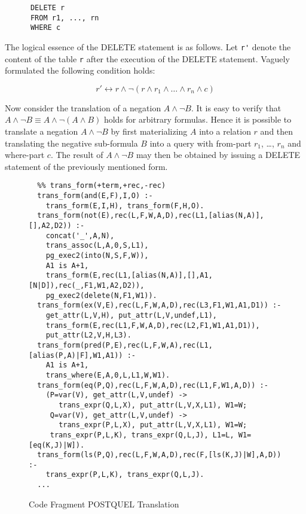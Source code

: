 \begin{verbatim}
      DELETE r
      FROM r1, ..., rn
      WHERE c
\end{verbatim}

The logical essence of the DELETE statement is as follows. Let \verb.r'. denote the content
of the table \verb.r. after the execution of the DELETE statement. Vaguely formulated the
following condition holds:

\begin{displaymath}
r' \leftrightarrow r \wedge \neg (r \wedge r_1 \wedge \ldots \wedge r_n \wedge c)
\end{displaymath}

Now consider the translation of a negation $A \wedge \neg B$. It is easy to verify that $A \wedge 
\neg B \equiv A \wedge \neg (A \wedge B)$ holds for arbitrary formulas. Hence it is possible 
to translate a negation $A \wedge \neg B$ by first materializing $A$ into a relation $r$ and then
translating the negative sub-formula $B$ into a query with from-part $r_1$, \ldots, $r_n$ 
and where-part $c$. The result of $A \wedge \neg B$ may then be obtained by issuing a DELETE 
statement of the previously mentioned form. 

\begin{figure}
{\small
\begin{verbatim}
  %% trans_form(+term,+rec,-rec)
  trans_form(and(E,F),I,O) :-
    trans_form(E,I,H), trans_form(F,H,O).
  trans_form(not(E),rec(L,F,W,A,D),rec(L1,[alias(N,A)],[],A2,D2)) :-
    concat('_',A,N),
    trans_assoc(L,A,0,S,L1),
    pg_exec2(into(N,S,F,W)),
    A1 is A+1,
    trans_form(E,rec(L1,[alias(N,A)],[],A1,[N|D]),rec(_,F1,W1,A2,D2)),
    pg_exec2(delete(N,F1,W1)).
  trans_form(ex(V,E),rec(L,F,W,A,D),rec(L3,F1,W1,A1,D1)) :-
    get_attr(L,V,H), put_attr(L,V,undef,L1), 
    trans_form(E,rec(L1,F,W,A,D),rec(L2,F1,W1,A1,D1)),
    put_attr(L2,V,H,L3).    
  trans_form(pred(P,E),rec(L,F,W,A),rec(L1,[alias(P,A)|F],W1,A1)) :-
    A1 is A+1,                     
    trans_where(E,A,0,L,L1,W,W1).
  trans_form(eq(P,Q),rec(L,F,W,A,D),rec(L1,F,W1,A,D)) :-
    (P=var(V), get_attr(L,V,undef) -> 
       trans_expr(Q,L,X), put_attr(L,V,X,L1), W1=W;
     Q=var(V), get_attr(L,V,undef) -> 
       trans_expr(P,L,X), put_attr(L,V,X,L1), W1=W;
     trans_expr(P,L,K), trans_expr(Q,L,J), L1=L, W1=[eq(K,J)|W]).
  trans_form(ls(P,Q),rec(L,F,W,A,D),rec(F,[ls(K,J)|W],A,D)) :-
    trans_expr(P,L,K), trans_expr(Q,L,J).
  ...
\end{verbatim}
}
\label{transpostquel}
\caption{Code Fragment POSTQUEL Translation}
\end{figure}

